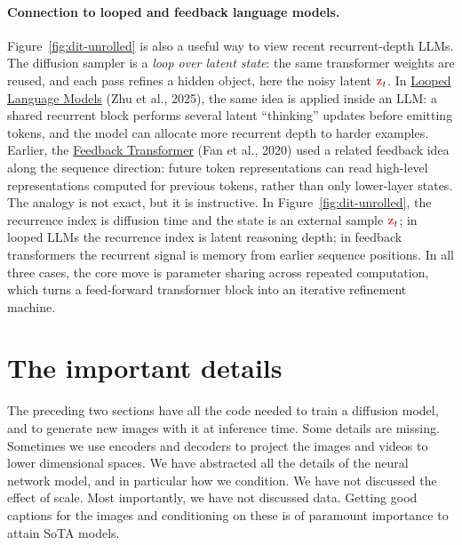 \documentclass[usenames,dvipsnames]{article}
\newcommand{\myvec}[1]{\mathbf{#1}}
\newcommand{\vz}{\myvec{\textcolor{Red}{z}}}
\begin{document}
\paragraph{Connection to looped and feedback language models.}
Figure~\ref{fig:dit-unrolled} is also a useful way to view recent recurrent-depth LLMs.  The diffusion sampler is a \emph{loop over latent state}: the same transformer weights are reused, and each pass refines a hidden object, here the noisy latent $\vz_t$.  In \href{https://arxiv.org/abs/2510.25741}{Looped Language Models} (Zhu et al., 2025), the same idea is applied inside an LLM: a shared recurrent block performs several latent ``thinking'' updates before emitting tokens, and the model can allocate more recurrent depth to harder examples.  Earlier, the \href{https://arxiv.org/abs/2002.09402}{Feedback Transformer} (Fan et al., 2020) used a related feedback idea along the sequence direction: future token representations can read high-level representations computed for previous tokens, rather than only lower-layer states.  The analogy is not exact, but it is instructive.  In Figure~\ref{fig:dit-unrolled}, the recurrence index is diffusion time and the state is an external sample $\vz_t$; in looped LLMs the recurrence index is latent reasoning depth; in feedback transformers the recurrent signal is memory from earlier sequence positions.  In all three cases, the core move is parameter sharing across repeated computation, which turns a feed-forward transformer block into an iterative refinement machine.


\section{The important details}

The preceding two sections have all the code needed to train a diffusion model, and to generate new images with it at inference time.
Some details are missing. Sometimes we use encoders and decoders to project the images and videos to lower dimensional spaces. We have abstracted all the details of the neural network model, and in particular how we condition. We have not discussed the effect of scale. Most importantly, we have not discussed data. Getting good captions for the images and conditioning on these is of paramount importance to attain SoTA models.
\end{document}
